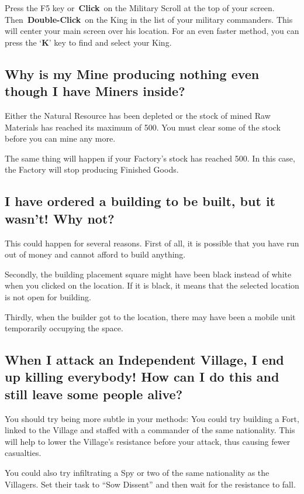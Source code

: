 Press the F5 key or \textbf{Click} on the Military Scroll at the top of your screen. Then \textbf{Double-Click} on the King in the list of your military commanders. This will center your main screen over his location. For an even faster method, you can press the ‘\textbf{K}’ key to find and select your King.

\subsection{Why is my Mine producing nothing even though I have Miners inside?}

Either the Natural Resource has been depleted or the stock of mined Raw Materials has reached its maximum of 500. You must clear some of the stock before you can mine any more.

The same thing will happen if your Factory’s stock has reached 500. In this case, the Factory will stop producing Finished Goods.

\subsection{I have ordered a building to be built, but it wasn’t! Why not?}

This could happen for several reasons. First of all, it is possible that you have run out of money and cannot afford to build anything.

Secondly, the building placement square might have been black instead of white when you clicked on the location. If it is black, it means that the selected location is not open for building.


Thirdly, when the builder got to the location, there may have been a mobile unit temporarily occupying the space.

\subsection{When I attack an Independent Village, I end up killing everybody! How can I do this and still leave some people alive?}

You should try being more subtle in your methods: You could try building a Fort, linked to the Village and staffed with a commander of the same nationality. This will help to lower the Village’s resistance before your attack, thus causing fewer casualties.

You could also try infiltrating a Spy or two of the same nationality as the Villagers. Set their task to “Sow Dissent” and then wait for the resistance to fall.

